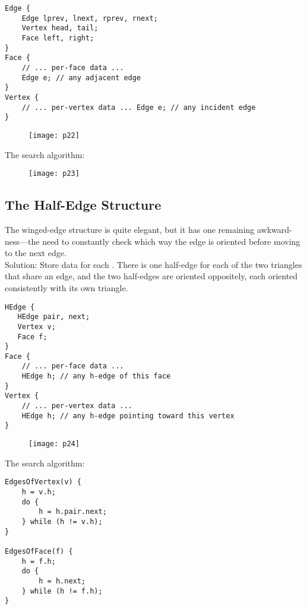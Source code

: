 \documentclass[11pt]{article}
\numberwithin{equation}{section}
\begin{document}
\begin{framed}
\begin{verbatim}
Edge {
	Edge lprev, lnext, rprev, rnext; 
	Vertex head, tail;
	Face left, right;
}
Face {
	// ... per-face data ...
	Edge e; // any adjacent edge
}
Vertex {
	// ... per-vertex data ... Edge e; // any incident edge
}
\end{verbatim}
\end{framed}
\begin{figure}[H]
	\centering
	\texttt{[image: p22]}
\end{figure}

The search algorithm:
\begin{figure}[H]
	\texttt{[image: p23]}
\end{figure}

\subsection{The Half-Edge Structure}
The winged-edge structure is quite elegant, but it has one remaining awkward- ness—the need to constantly check which way the edge is oriented before moving to the next edge. \\
Solution: Store data for each . There is one half-edge for each of the two triangles that share an edge, and the two half-edges are oriented oppositely, each oriented consistently with its own triangle.\\
\begin{framed}
\begin{verbatim}
HEdge {
   HEdge pair, next;
   Vertex v;
   Face f;
}
Face {
	// ... per-face data ...
	HEdge h; // any h-edge of this face
}
Vertex {
	// ... per-vertex data ...
	HEdge h; // any h-edge pointing toward this vertex
}

\end{verbatim}
\end{framed}
\begin{figure}[H]
	\centering
	\texttt{[image: p24]}
\end{figure}

The search algorithm:
\begin{framed}
\begin{verbatim}
EdgesOfVertex(v) { 
	h = v.h;
	do {
		h = h.pair.next;
	} while (h != v.h); 
}

EdgesOfFace(f) { 
	h = f.h;
	do {
		h = h.next;
	} while (h != f.h); 
}
\end{verbatim}
\end{framed}
\end{document}
